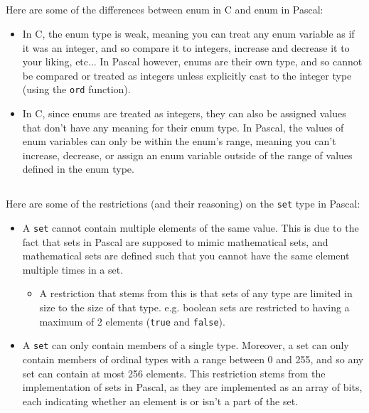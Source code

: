 \documentclass{article}
\begin{document}
\subsection{}
Here are some of the differences between enum in C and enum in Pascal:
\begin{itemize}
    \item In C, the enum type is weak, meaning you can treat any enum variable as if it was an integer, and so compare it to integers, increase and decrease it to your liking, etc... In Pascal however, enums are their own type, and so cannot be compared or treated as integers unless explicitly cast to the integer type (using the \lstinline{ord} function).
    \item In C, since enums are treated as integers, they can also be assigned values that don't have any meaning for their enum type. In Pascal, the values of enum variables can only be within the enum's range, meaning you can't increase, decrease, or assign an enum variable outside of the range of values defined in the enum type.
\end{itemize}

\subsection{}
Here are some of the restrictions (and their reasoning) on the \lstinline{set} type in Pascal:
\begin{itemize}
    \item A \lstinline{set} cannot contain multiple elements of the same value. This is due to the fact that sets in Pascal are supposed to mimic mathematical sets, and mathematical sets are defined such that you cannot have the same element multiple times in a set.
        \begin{itemize}
            \item A restriction that stems from this is that sets of any type are limited in size to the size of that type. e.g. boolean sets are restricted to having a maximum of 2 elements (\lstinline{true} and \lstinline{false}).
        \end{itemize}
    \item A \lstinline{set} can only contain members of a single type. Moreover, a set can only contain members of ordinal types with a range between 0 and 255, and so any set can contain at most 256 elements. This restriction stems from the implementation of sets in Pascal, as they are implemented as an array of bits, each indicating whether an element is or isn't a part of the set.
\end{itemize}
\end{document}
